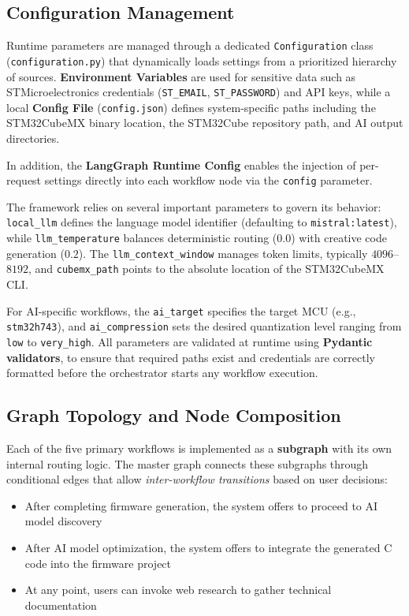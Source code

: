 \subsection{Configuration Management}

Runtime parameters are managed through a dedicated \texttt{Configuration} class (\texttt{configuration.\allowbreak py}) that dynamically loads settings from a prioritized hierarchy of sources. \textbf{Environment Variables} are used for sensitive data such as STMicroelectronics credentials (\texttt{ST\_EMAIL}, \texttt{ST\_PASSWORD}) and API keys, while a local \textbf{Config File} (\texttt{config.json}) defines system-specific paths including the STM32CubeMX binary location, the STM32Cube repository path, and AI output directories. 

In addition, the \textbf{LangGraph Runtime Config} enables the injection of per-request settings directly into each workflow node via the \texttt{config} parameter.

The framework relies on several important parameters to govern its behavior: \texttt{local\_llm} defines the language model identifier (defaulting to \texttt{mistral:latest}), while \texttt{llm\_temperature} balances deterministic routing ($0.0$) with creative code generation ($0.2$). The \texttt{llm\_\allowbreak context\_\allowbreak window} manages token limits, typically $4096$--$8192$, and \texttt{cubemx\_path} points to the absolute location of the STM32CubeMX CLI. 

For AI-specific workflows, the \texttt{ai\_target} specifies the target MCU (e.g., \texttt{stm32h743}), and \texttt{ai\_compression} sets the desired quantization level ranging from \texttt{low} to \texttt{very\_high}. All parameters are validated at runtime using \textbf{Pydantic validators}, to ensure that required paths exist and credentials are correctly formatted before the orchestrator starts any workflow execution.

\subsection{Graph Topology and Node Composition}

Each of the five primary workflows is implemented as a \textbf{subgraph} with its own internal routing logic. The master graph connects these subgraphs through conditional edges that allow \textit{inter-workflow transitions} based on user decisions:

\begin{itemize}
    \item After completing firmware generation, the system offers to proceed to AI model discovery
    \item After AI model optimization, the system offers to integrate the generated C code into the firmware project
    \item At any point, users can invoke web research to gather technical documentation
\end{itemize}

